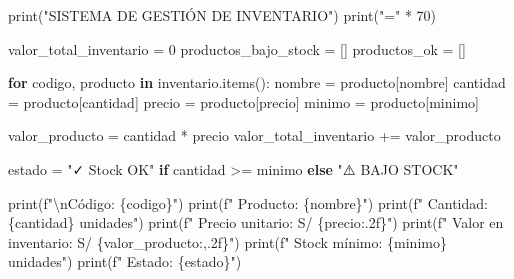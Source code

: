 \documentclass[
  doc,
  floatsintext,
  longtable,
  a4paper,
  nolmodern,
  notxfonts,
  notimes,
  12pt,
  colorlinks=true,linkcolor=blue,citecolor=blue,urlcolor=blue]{apa7}
\newenvironment{Shaded}{\begin{snugshade}}{\end{snugshade}}
\newcommand{\BuiltInTok}[1]{\textcolor[rgb]{0.00,0.23,0.31}{#1}}
\newcommand{\CharTok}[1]{\textcolor[rgb]{0.13,0.47,0.30}{#1}}
\newcommand{\ControlFlowTok}[1]{\textcolor[rgb]{0.00,0.23,0.31}{\textbf{#1}}}
\newcommand{\DecValTok}[1]{\textcolor[rgb]{0.68,0.00,0.00}{#1}}
\newcommand{\KeywordTok}[1]{\textcolor[rgb]{0.00,0.23,0.31}{\textbf{#1}}}
\newcommand{\NormalTok}[1]{\textcolor[rgb]{0.00,0.23,0.31}{#1}}
\newcommand{\OperatorTok}[1]{\textcolor[rgb]{0.37,0.37,0.37}{#1}}
\newcommand{\SpecialCharTok}[1]{\textcolor[rgb]{0.37,0.37,0.37}{#1}}
\newcommand{\SpecialStringTok}[1]{\textcolor[rgb]{0.13,0.47,0.30}{#1}}
\newcommand{\StringTok}[1]{\textcolor[rgb]{0.13,0.47,0.30}{#1}}
\begin{document}
\begin{Shaded}
\begin{Highlighting}[]
\BuiltInTok{print}\NormalTok{(}\StringTok{"SISTEMA DE GESTIÓN DE INVENTARIO"}\NormalTok{)}
\BuiltInTok{print}\NormalTok{(}\StringTok{"="} \OperatorTok{*} \DecValTok{70}\NormalTok{)}

\NormalTok{valor\_total\_inventario }\OperatorTok{=} \DecValTok{0}
\NormalTok{productos\_bajo\_stock }\OperatorTok{=}\NormalTok{ []}
\NormalTok{productos\_ok }\OperatorTok{=}\NormalTok{ []}

\ControlFlowTok{for}\NormalTok{ codigo, producto }\KeywordTok{in}\NormalTok{ inventario.items():}
\NormalTok{    nombre }\OperatorTok{=}\NormalTok{ producto[}\StringTok{\textquotesingle{}nombre\textquotesingle{}}\NormalTok{]}
\NormalTok{    cantidad }\OperatorTok{=}\NormalTok{ producto[}\StringTok{\textquotesingle{}cantidad\textquotesingle{}}\NormalTok{]}
\NormalTok{    precio }\OperatorTok{=}\NormalTok{ producto[}\StringTok{\textquotesingle{}precio\textquotesingle{}}\NormalTok{]}
\NormalTok{    minimo }\OperatorTok{=}\NormalTok{ producto[}\StringTok{\textquotesingle{}minimo\textquotesingle{}}\NormalTok{]}
    
\NormalTok{    valor\_producto }\OperatorTok{=}\NormalTok{ cantidad }\OperatorTok{*}\NormalTok{ precio}
\NormalTok{    valor\_total\_inventario }\OperatorTok{+=}\NormalTok{ valor\_producto}
    
\NormalTok{    estado }\OperatorTok{=} \StringTok{"✓ Stock OK"} \ControlFlowTok{if}\NormalTok{ cantidad }\OperatorTok{\textgreater{}=}\NormalTok{ minimo }\ControlFlowTok{else} \StringTok{"⚠️ BAJO STOCK"}
    
    \BuiltInTok{print}\NormalTok{(}\SpecialStringTok{f"}\CharTok{\textbackslash{}n}\SpecialStringTok{Código: }\SpecialCharTok{\{}\NormalTok{codigo}\SpecialCharTok{\}}\SpecialStringTok{"}\NormalTok{)}
    \BuiltInTok{print}\NormalTok{(}\SpecialStringTok{f"  Producto: }\SpecialCharTok{\{}\NormalTok{nombre}\SpecialCharTok{\}}\SpecialStringTok{"}\NormalTok{)}
    \BuiltInTok{print}\NormalTok{(}\SpecialStringTok{f"  Cantidad: }\SpecialCharTok{\{}\NormalTok{cantidad}\SpecialCharTok{\}}\SpecialStringTok{ unidades"}\NormalTok{)}
    \BuiltInTok{print}\NormalTok{(}\SpecialStringTok{f"  Precio unitario: S/ }\SpecialCharTok{\{}\NormalTok{precio}\SpecialCharTok{:.2f\}}\SpecialStringTok{"}\NormalTok{)}
    \BuiltInTok{print}\NormalTok{(}\SpecialStringTok{f"  Valor en inventario: S/ }\SpecialCharTok{\{}\NormalTok{valor\_producto}\SpecialCharTok{:,.2f\}}\SpecialStringTok{"}\NormalTok{)}
    \BuiltInTok{print}\NormalTok{(}\SpecialStringTok{f"  Stock mínimo: }\SpecialCharTok{\{}\NormalTok{minimo}\SpecialCharTok{\}}\SpecialStringTok{ unidades"}\NormalTok{)}
    \BuiltInTok{print}\NormalTok{(}\SpecialStringTok{f"  Estado: }\SpecialCharTok{\{}\NormalTok{estado}\SpecialCharTok{\}}\SpecialStringTok{"}\NormalTok{)}
    

\end{Highlighting}
\end{Shaded}
\end{document}
